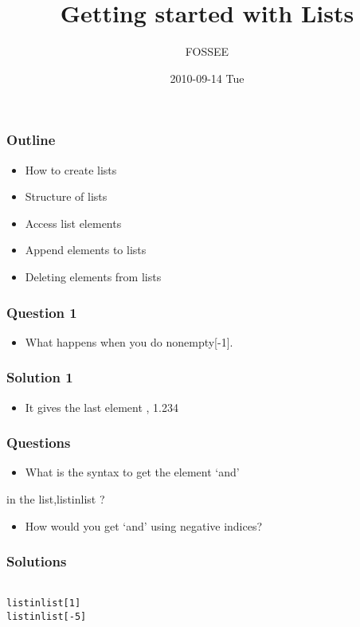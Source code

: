 \documentclass[presentation]{beamer}
\title{Getting started with Lists}
\author{FOSSEE}
\date{2010-09-14 Tue}
\begin{document}
\maketitle










\begin{frame}
\frametitle{Outline}
\label{sec-1}

\begin{itemize}
\item How to create lists
\item Structure of lists
\item Access list elements
\item Append elements to lists
\item Deleting elements from lists
\end{itemize}
\end{frame}
\begin{frame}
\frametitle{Question 1}
\label{sec-2}

\begin{itemize}
\item What happens when you do nonempty[-1].
\end{itemize}
\end{frame}
\begin{frame}
\frametitle{Solution 1}
\label{sec-3}

\begin{itemize}
\item It gives the last element , 1.234
\end{itemize}
\end{frame}
\begin{frame}
\frametitle{Questions}
\label{sec-4}

\begin{itemize}
\item What is the syntax to get the element `and'
\end{itemize}

in the list,listinlist ?


\begin{itemize}
\item How would you get `and' using negative indices?
\end{itemize}
\end{frame}
\begin{frame}[fragile]
\frametitle{Solutions}
\label{sec-5}

\begin{verbatim}

listinlist[1]
listinlist[-5]
\end{verbatim}
\end{frame}
\end{document}
